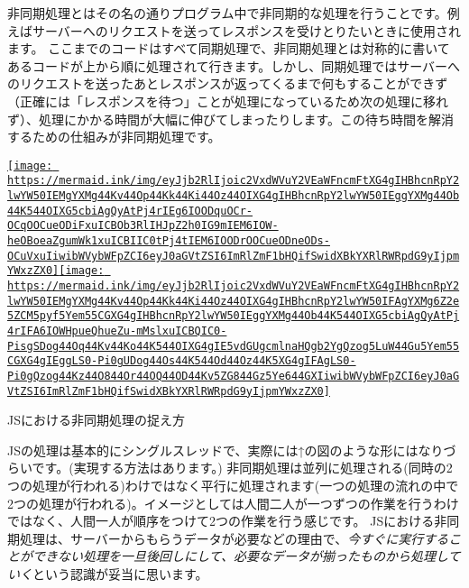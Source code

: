 非同期処理とはその名の通りプログラム中で非同期的な処理を行うことです。例えばサーバーへのリクエストを送ってレスポンスを受けとりたいときに使用されます。
ここまでのコードはすべて同期処理で、非同期処理とは対称的に書いてあるコードが上から順に処理されて行きます。しかし、同期処理ではサーバーへのリクエストを送ったあとレスポンスが返ってくるまで何もすることができず（正確には「レスポンスを待つ」ことが処理になっているため次の処理に移れず）、処理にかかる時間が大幅に伸びてしまったりします。この待ち時間を解消するための仕組みが非同期処理です。

\href{https://mermaid-js.github.io/docs/mermaid-live-editor-beta/\#/edit/eyJjb2RlIjoic2VxdWVuY2VEaWFncmFtXG4gIHBhcnRpY2lwYW50IEMgYXMg44Kv44Op44Kk44Ki44Oz44OIXG4gIHBhcnRpY2lwYW50IEggYXMg44Ob44K544OIXG5cbiAgQyAtPj4rIEg6IOODquOCr-OCqOOCueODiFxuICBOb3RlIHJpZ2h0IG9mIEM6IOW-heOBoeaZgumWk1xuICBIIC0tPj4tIEM6IOODrOOCueODneODs-OCuVxuIiwibWVybWFpZCI6eyJ0aGVtZSI6ImRlZmF1bHQifSwidXBkYXRlRWRpdG9yIjpmYWxzZX0}{\texttt{[image: https://mermaid.ink/img/eyJjb2RlIjoic2VxdWVuY2VEaWFncmFtXG4gIHBhcnRpY2lwYW50IEMgYXMg44Kv44Op44Kk44Ki44Oz44OIXG4gIHBhcnRpY2lwYW50IEggYXMg44Ob44K544OIXG5cbiAgQyAtPj4rIEg6IOODquOCr-OCqOOCueODiFxuICBOb3RlIHJpZ2h0IG9mIEM6IOW-heOBoeaZgumWk1xuICBIIC0tPj4tIEM6IOODrOOCueODneODs-OCuVxuIiwibWVybWFpZCI6eyJ0aGVtZSI6ImRlZmF1bHQifSwidXBkYXRlRWRpdG9yIjpmYWxzZX0]}}\href{https://mermaid-js.github.io/docs/mermaid-live-editor-beta/\#/edit/eyJjb2RlIjoic2VxdWVuY2VEaWFncmFtXG4gIHBhcnRpY2lwYW50IEMgYXMg44Kv44Op44Kk44Ki44Oz44OIXG4gIHBhcnRpY2lwYW50IFAgYXMg6Z2e5ZCM5pyf5Yem55CGXG4gIHBhcnRpY2lwYW50IEggYXMg44Ob44K544OIXG5cbiAgQyAtPj4rIFA6IOWHpueQhueZu-mMslxuICBQIC0-PisgSDog44Oq44Kv44Ko44K544OIXG4gIE5vdGUgcmlnaHQgb2YgQzog5LuW44Gu5Yem55CGXG4gIEggLS0-Pi0gUDog44Os44K544Od44Oz44K5XG4gIFAgLS0-Pi0gQzog44Kz44O844Or44OQ44OD44Kv5ZG844Gz5Ye644GXIiwibWVybWFpZCI6eyJ0aGVtZSI6ImRlZmF1bHQifSwidXBkYXRlRWRpdG9yIjpmYWxzZX0}{\texttt{[image: https://mermaid.ink/img/eyJjb2RlIjoic2VxdWVuY2VEaWFncmFtXG4gIHBhcnRpY2lwYW50IEMgYXMg44Kv44Op44Kk44Ki44Oz44OIXG4gIHBhcnRpY2lwYW50IFAgYXMg6Z2e5ZCM5pyf5Yem55CGXG4gIHBhcnRpY2lwYW50IEggYXMg44Ob44K544OIXG5cbiAgQyAtPj4rIFA6IOWHpueQhueZu-mMslxuICBQIC0-PisgSDog44Oq44Kv44Ko44K544OIXG4gIE5vdGUgcmlnaHQgb2YgQzog5LuW44Gu5Yem55CGXG4gIEggLS0-Pi0gUDog44Os44K544Od44Oz44K5XG4gIFAgLS0-Pi0gQzog44Kz44O844Or44OQ44OD44Kv5ZG844Gz5Ye644GXIiwibWVybWFpZCI6eyJ0aGVtZSI6ImRlZmF1bHQifSwidXBkYXRlRWRpdG9yIjpmYWxzZX0]}}

JSにおける非同期処理の捉え方

JSの処理は基本的にシングルスレッドで、実際には↑の図のような形にはなりづらいです。(実現する方法はあります。)
非同期処理は並列に処理される(同時の2つの処理が行われる)わけではなく平行に処理されます(一つの処理の流れの中で2つの処理が行われる)。イメージとしては人間二人が一つずつの作業を行うわけではなく、人間一人が順序をつけて2つの作業を行う感じです。
JSにおける非同期処理は、サーバーからもらうデータが必要などの理由で、\emph{今すぐに実行することができない処理を一旦後回しにして、必要なデータが揃ったものから処理していく}という認識が妥当に思います。

